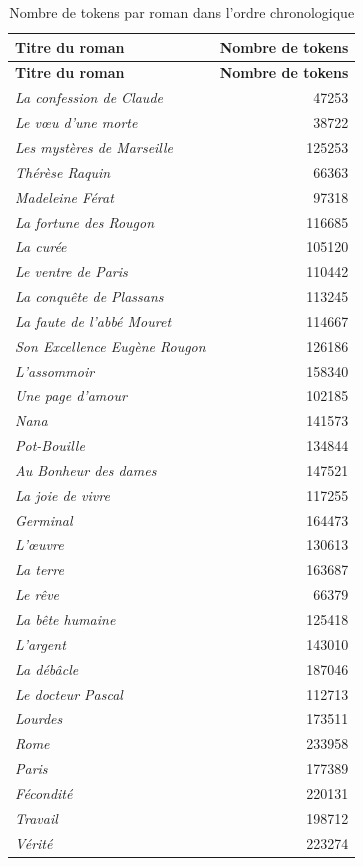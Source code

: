 \begin{longtable}{p{8cm}r}
\caption{Nombre de tokens par roman dans l'ordre chronologique}  \\
\toprule
\textbf{Titre du roman} & \textbf{Nombre de tokens} \\
\midrule
\endfirsthead

\toprule
\textbf{Titre du roman} & \textbf{Nombre de tokens} \\
\midrule
\endhead

\textit{La confession de Claude} & 47253 \\
\textit{Le vœu d'une morte} & 38722 \\
\textit{Les mystères de Marseille} & 125253 \\
\textit{Thérèse Raquin} & 66363 \\
\textit{Madeleine Férat} & 97318 \\
\textit{La fortune des Rougon} & 116685 \\
\textit{La curée} & 105120 \\
\textit{Le ventre de Paris} & 110442 \\
\textit{La conquête de Plassans} & 113245 \\
\textit{La faute de l'abbé Mouret} & 114667 \\
\textit{Son Excellence Eugène Rougon} & 126186 \\
\textit{L'assommoir} & 158340 \\
\textit{Une page d'amour} & 102185 \\
\textit{Nana} & 141573 \\
\textit{Pot-Bouille} & 134844 \\
\textit{Au Bonheur des dames} & 147521 \\
\textit{La joie de vivre} & 117255 \\
\textit{Germinal} & 164473 \\
\textit{L'œuvre} & 130613 \\
\textit{La terre} & 163687 \\
\textit{Le rêve} & 66379 \\
\textit{La bête humaine} & 125418 \\
\textit{L'argent} & 143010 \\
\textit{La débâcle} & 187046 \\
\textit{Le docteur Pascal} & 112713 \\
\textit{Lourdes} & 173511 \\
\textit{Rome} & 233958 \\
\textit{Paris} & 177389 \\
\textit{Fécondité} & 220131 \\
\textit{Travail} & 198712 \\
\textit{Vérité} & 223274 \\

\bottomrule
\end{longtable}

